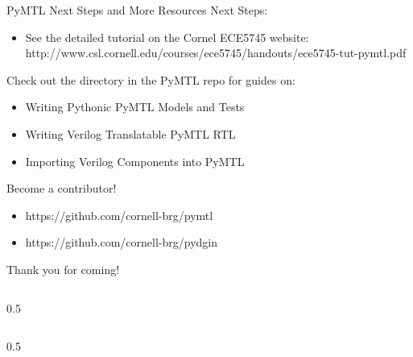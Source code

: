 \begin{frame}{PyMTL Next Steps and More Resources}
Next Steps:
\begin{itemize}
  \item See the detailed tutorial on the Cornel ECE5745 website:
        \footnotesize{http://www.csl.cornell.edu/courses/ece5745/handouts/ece5745-tut-pymtl.pdf}
\end{itemize}

\smallskip
Check out the  directory in the PyMTL repo for guides on:
\begin{itemize}
  \item Writing Pythonic PyMTL Models and Tests
  \item Writing Verilog Translatable PyMTL RTL
  \item Importing Verilog Components into PyMTL
\end{itemize}

\smallskip
Become a contributor!
\begin{itemize}
  \item https://github.com/cornell-brg/pymtl
  \item https://github.com/cornell-brg/pydgin
\end{itemize}
\end{frame}

\begin{frame}{Thank you for coming!}
  \begin{cbxcols}
  \begin{column}{0.5\tw}
  \vspace{.2in}

  \vspace{.3in}

  \vspace{.363in}
  \centering{[ MICRO 2014 ]}
  \end{column}

  \begin{column}{0.5\tw}
  \vspace{.2in}

  \vspace{.3in}

  \vspace{.2in}
  \centering{[ ISPASS 2015 ]}

  \end{column}
  \end{cbxcols}
\end{frame}

